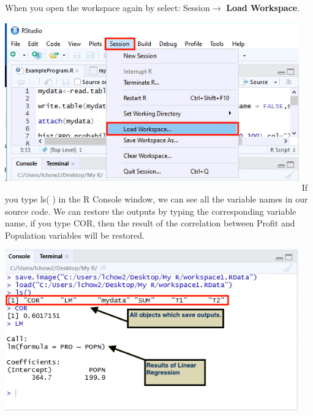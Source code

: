 \documentclass[a4paper]{report}
\begin{document}
\begin{flushleft}
            When you open the workspace again by select: Session$\longrightarrow$ \textbf{Load Workspace}. 
            \newline \newline
                     \includegraphics[width=5in,height=3in]{images/SAVE6.png}
            \newline \newline
            If you type ls( ) in the R Console window, we can see all the variable names in our source code. We can restore the outputs by typing the corresponding variable name, if you type COR, then the result of the correlation between Profit and Population variables will be restored.
            \newline\newline
                    \includegraphics[width=5in,height=3in]{images/SAVE8.png}
        \end{flushleft}
      
\end{document}
